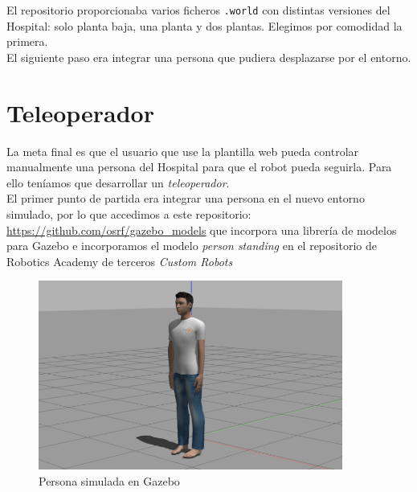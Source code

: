 El repositorio proporcionaba varios ficheros \texttt{.world} con distintas versiones del Hospital: solo planta baja, una planta y dos plantas. Elegimos por comodidad la primera.\\

El siguiente paso era integrar una persona que pudiera desplazarse por el entorno.\\



\section{Teleoperador}
\label{sec:teleoperador}

La meta final es que el usuario que use la plantilla web pueda controlar manualmente una persona del Hospital para que el robot pueda seguirla. Para ello teníamos que desarrollar un \textit{teleoperador}.\\

El primer punto de partida era integrar una persona en el nuevo entorno simulado, por lo que accedimos a este repositorio: \url{https://github.com/osrf/gazebo_models} que incorpora una librería de modelos para Gazebo e incorporamos el modelo \textit{person standing} en el repositorio de Robotics Academy de terceros \textit{Custom Robots}\\

\begin{figure} [H]
  \begin{center}
    \includegraphics[width=10cm]{imagenes/cap5/person_model.png}
  \end{center}
  \caption[Persona simulada en Gazebo]{Persona simulada en Gazebo}
  \label{fig:persona_gazebo}
\end{figure}\

